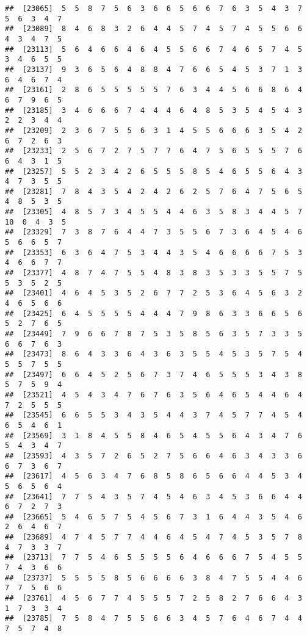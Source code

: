 \documentclass[
]{book}
\begin{document}
\begin{verbatim}
##  [23065]  5  5  8  7  5  6  3  6  6  5  6  6  7  6  3  5  4  3  7  5  6  3  4  7
##  [23089]  8  4  6  8  3  2  6  4  4  5  7  4  5  7  4  5  5  6  6  4  3  4  7  5
##  [23113]  5  6  4  6  6  4  6  4  5  5  6  6  7  4  6  5  7  4  5  3  4  6  5  5
##  [23137]  9  3  6  5  6  4  8  8  4  7  6  6  5  4  5  3  7  1  3  6  4  6  7  4
##  [23161]  2  8  6  5  5  5  5  5  7  6  3  4  4  5  6  6  8  6  4  6  7  9  6  5
##  [23185]  3  4  6  6  6  7  4  4  4  6  4  8  5  3  5  4  5  4  3  2  2  3  4  4
##  [23209]  2  3  6  7  5  5  6  3  1  4  5  5  6  6  6  3  5  4  2  6  7  2  6  3
##  [23233]  2  5  6  7  2  7  5  7  7  6  4  7  5  6  5  5  5  7  6  6  4  3  1  5
##  [23257]  5  5  2  3  4  2  6  5  5  5  8  5  4  6  5  5  6  4  3  4  7  3  5  5
##  [23281]  7  8  4  3  5  4  2  4  2  6  2  5  7  6  4  7  5  6  5  4  8  5  3  5
##  [23305]  4  8  5  7  3  4  5  5  4  4  6  3  5  8  3  4  4  5  7 10  0  4  3  5
##  [23329]  7  3  8  7  6  4  4  7  3  5  5  6  7  3  6  4  5  4  6  5  6  6  5  7
##  [23353]  6  3  6  4  7  5  3  4  4  3  5  4  6  6  6  6  7  5  3  4  6  6  7  7
##  [23377]  4  8  7  4  7  5  5  4  8  3  8  3  5  3  3  5  5  7  5  5  3  5  2  5
##  [23401]  4  6  4  5  3  5  2  6  7  7  2  5  3  6  4  5  6  3  2  4  6  5  6  6
##  [23425]  6  4  5  5  5  5  4  4  4  7  9  8  6  3  3  6  6  5  6  5  2  7  6  5
##  [23449]  7  9  6  6  7  8  7  5  3  5  8  5  6  3  5  7  3  3  5  6  6  7  6  3
##  [23473]  8  6  4  3  3  6  4  3  6  3  5  5  4  5  3  5  7  5  4  5  5  7  5  5
##  [23497]  6  6  4  5  2  5  6  7  3  7  4  6  5  5  5  3  4  3  8  5  7  5  9  4
##  [23521]  4  5  4  3  4  7  6  7  6  3  5  6  4  6  5  4  4  6  4  7  2  5  5  5
##  [23545]  6  6  5  5  3  4  3  5  4  4  3  7  4  5  7  7  4  5  4  6  5  4  6  1
##  [23569]  3  1  8  4  5  5  8  4  6  5  4  5  5  6  4  3  4  7  6  5  4  3  4  7
##  [23593]  4  3  5  7  2  6  5  2  7  5  6  6  4  6  3  4  3  3  6  6  7  3  6  7
##  [23617]  4  5  6  3  4  7  6  8  5  8  6  5  6  6  4  4  5  3  4  5  6  5  6  4
##  [23641]  7  7  5  4  3  5  7  4  5  4  6  3  4  5  3  6  6  4  4  6  7  2  7  3
##  [23665]  5  4  6  5  7  5  4  5  6  7  3  1  6  4  4  3  5  4  6  2  6  4  6  7
##  [23689]  4  7  4  5  7  7  4  4  6  4  5  4  7  4  5  3  5  7  8  4  7  3  3  7
##  [23713]  7  7  5  4  6  5  5  5  5  6  4  6  6  6  7  5  4  5  5  7  4  3  6  6
##  [23737]  5  5  5  5  8  5  6  6  6  6  3  8  4  7  5  5  4  4  6  7  7  5  6  6
##  [23761]  4  5  6  7  7  4  5  5  5  7  2  5  8  2  7  6  6  4  3  1  7  3  3  4
##  [23785]  7  5  8  4  7  5  5  6  6  3  4  5  7  6  4  6  7  4  4  7  5  7  4  8

\end{verbatim}
\end{document}
